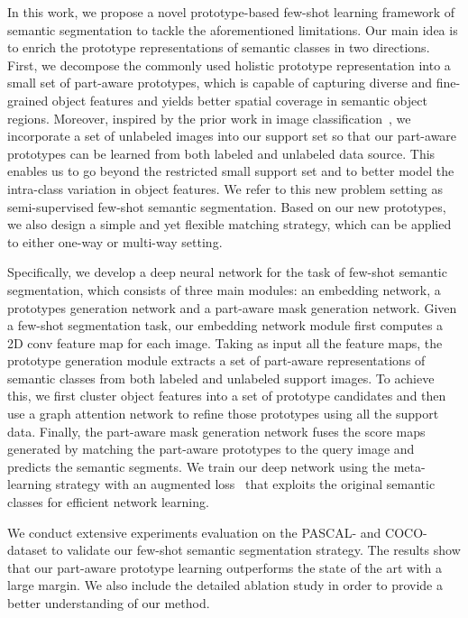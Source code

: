 \documentclass[runningheads]{llncs}
\begin{document}
In this work, we propose a novel prototype-based few-shot learning framework of semantic segmentation to tackle the aforementioned limitations. Our main idea is to enrich the prototype representations of semantic classes in two directions. First, we decompose the commonly used holistic prototype representation into a small set of part-aware prototypes, which is capable of capturing diverse and fine-grained object features and yields better spatial coverage in semantic object regions. Moreover, inspired by the prior work in image classification~\cite{ren2018meta,ayyad2019semi}, we incorporate a set of unlabeled images into our support set so that our part-aware prototypes can be learned from both labeled and unlabeled data source. This enables us to go beyond the restricted small support set and to better model the intra-class variation in object features. We refer to this new problem setting as semi-supervised few-shot semantic segmentation. Based on our new prototypes, we also design a simple and yet flexible matching strategy, which can be applied to either one-way or multi-way setting.   

Specifically, we develop a deep neural network for the task of few-shot semantic segmentation, which consists of three main modules: an embedding network, a prototypes generation network and a part-aware mask generation network. 
Given a few-shot segmentation task, our embedding network module first computes a 2D conv feature map for each image. Taking as input all the feature maps, the prototype generation module extracts a set of part-aware representations of semantic classes from both labeled and unlabeled support images. To achieve this, we first cluster object features into a set of prototype candidates and then use a graph attention network to refine those prototypes using all the support data.
Finally, the part-aware mask generation network fuses the score maps generated by matching
the part-aware prototypes to the query image and predicts the semantic segments.
We train our deep network using the meta-learning strategy with an augmented loss~\cite{yan2019dual} that exploits the original semantic classes for efficient network learning.    
  
We conduct extensive experiments evaluation on the PASCAL-\cite{boots2017one,zhang2018sg} and COCO- dataset\cite{wang2019panet,nguyen2019feature} to validate our few-shot semantic segmentation strategy. The results show that our part-aware prototype learning outperforms the state of the art with a large margin. We also include the detailed ablation study in order to provide a better understanding of our method.
\end{document}
